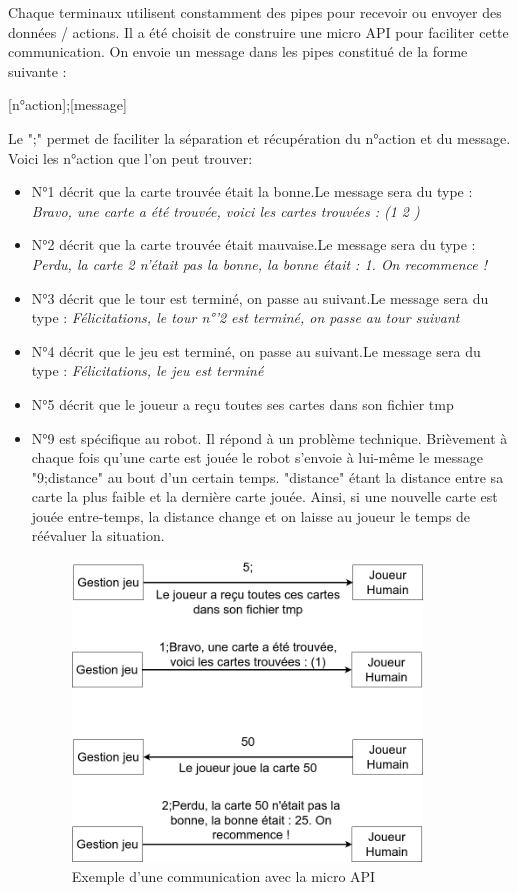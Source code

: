 \documentclass{article}
\begin{document}
Chaque terminaux utilisent constamment des pipes pour recevoir ou envoyer des données / actions. Il a été choisit de construire une micro API pour faciliter cette communication. On envoie un message dans les pipes constitué de la forme suivante :
\begin{center}
[n°action];[message]
\end{center}
Le ";" permet de faciliter la séparation et récupération du n°action et du message. Voici les n°action que l'on peut trouver:
\begin{itemize}
	\item N°1 décrit que la carte trouvée était la bonne.\newline Le message sera du type : \textit{Bravo, une carte a été trouvée, voici les cartes trouvées : (1 2 )}
	\item N°2 décrit que la carte trouvée était mauvaise.\newline Le message sera du type : \textit{Perdu, la carte 2 n'était pas la bonne, la bonne était : 1. On recommence !}  
	\item N°3 décrit que le tour est terminé, on passe au suivant.\newline Le message sera du type : \textit{Félicitations, le tour n°'2 est terminé, on passe au tour suivant} 
	\item N°4 décrit que le jeu est terminé, on passe au suivant.\newline Le message sera du type : \textit{Félicitations, le jeu est terminé}
	\item N°5 décrit que le joueur a reçu toutes ses cartes dans son fichier tmp     
	\item N°9 est spécifique au robot. Il répond à un problème technique. Brièvement à chaque fois qu'une carte est jouée le robot s'envoie à lui-même le message "9;distance" au bout d'un certain temps. "distance" étant la distance entre sa carte la plus faible et la dernière carte jouée. Ainsi, si une nouvelle carte est jouée entre-temps, la distance change et on laisse au joueur le temps de réévaluer la situation.
	
\begin{figure}[!htb]
	\centering
    	\includegraphics[height=8cm]{./assets/pipe_com.png}
    	\caption{
	    	Exemple d'une communication avec la micro API
    	}
    	\label{fig:pipe}
\end{figure}


\end{itemize}
\end{document}
